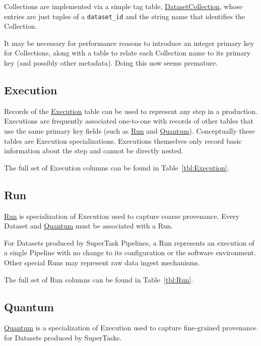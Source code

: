 \documentclass[DM,toc]{lsstdoc}
\newcommand{\tblref}[1]{\hyperref[tbl:#1]{#1}}
\newcommand{\coltable}[1]{
    \begin{table}[htb]
        {
            \footnotesize
            
        }
        \caption{#1 Columns}
        \label{tbl:#1}
    \end{table}
}
\begin{document}
Collections are implemented via a simple tag table, \tblref{DatasetCollection}, whose entries are just tuples of a \texttt{dataset\_id} and the string name that identifies the Collection.

It may be necessary for performance reasons to introduce an integer primary key for Collections, along with a table to relate each Collection name to its primary key (and possibly other metadata).
Doing this now seems premature.

\coltable{DatasetCollection}

\subsection{Execution}
\label{sec:excution}

Records of the \tblref{Execution} table can be used to represent any step in a production.
Executions are frequently associated one-to-one with records of other tables that use the same primary key fields (such as \hyperref[sec:run]{Run} and \hyperref[sec:quantum]{Quantum}).
Conceptually these tables are Execution specializations.
Executions themselves only record basic information about the step and cannot be directly nested.

The full set of Execution columns can be found in Table~\ref{tbl:Execution}.

\coltable{Execution}

\subsection{Run}
\label{sec:run}

\tblref{Run} is specialization of Execution used to capture coarse provenance.
Every Dataset and \hyperref[sec:quantum]{Quantum} must be associated with a Run.

For Datasets produced by SuperTask Pipelines, a Run represents an execution of a single Pipeline with no change to its configuration or the software environment.
Other special Runs may represent raw data ingest mechanisms.

The full set of Run columns can be found in Table~\ref{tbl:Run}.

\coltable{Run}

\subsection{Quantum}
\label{sec:quantum}

\tblref{Quantum} is a specialization of Execution used to capture fine-grained provenance for Datasets produced by SuperTasks.
\end{document}
